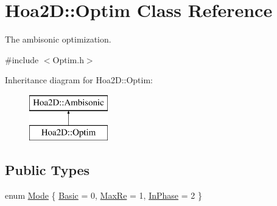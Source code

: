 \hypertarget{class_hoa2_d_1_1_optim}{\section{Hoa2\-D\-:\-:Optim Class Reference}
\label{class_hoa2_d_1_1_optim}
}


The ambisonic optimization.  




{\ttfamily \#include $<$Optim.\-h$>$}

Inheritance diagram for Hoa2\-D\-:\-:Optim\-:\begin{figure}[H]
\begin{center}
\leavevmode
\includegraphics[height=2.000000cm]{class_hoa2_d_1_1_optim}
\end{center}
\end{figure}
\subsection*{Public Types}
\begin{DoxyCompactItemize}
\item 
enum \hyperlink{class_hoa2_d_1_1_optim_ae40f22368cb55699cf19729e37c0aff3}{Mode} \{ \hyperlink{class_hoa2_d_1_1_optim_ae40f22368cb55699cf19729e37c0aff3af5bbb98a42968855f2f43d9a708ae8d2}{Basic} = 0, 
\hyperlink{class_hoa2_d_1_1_optim_ae40f22368cb55699cf19729e37c0aff3a6b8b2446e2cffae18f5f4625b68e0f21}{Max\-Re} = 1, 
\hyperlink{class_hoa2_d_1_1_optim_ae40f22368cb55699cf19729e37c0aff3aa9a64070fdf166180add5ac7a8e24567}{In\-Phase} = 2
 \}
\end{DoxyCompactItemize}
